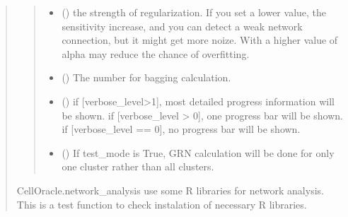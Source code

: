 \documentclass[letterpaper,10pt,english]{sphinxmanual}
\begin{document}
\begin{quote}
\begin{fulllineitems}
\begin{quote}
\begin{description}
\begin{itemize}
\item {} 
 () \textendash{} the strength of regularization.
If you set a lower value, the sensitivity increase, and you can detect a weak network connection, but it might get more noize.
With a higher value of alpha may reduce the chance of overfitting.

\item {} 
 () \textendash{} The number for bagging calculation.

\item {} 
 () \textendash{} if {[}verbose\_level\textgreater{}1{]}, most detailed progress information will be shown.
if {[}verbose\_level \textgreater{} 0{]}, one progress bar will be shown.
if {[}verbose\_level == 0{]}, no progress bar will be shown.

\item {} 
 () \textendash{} If test\_mode is True, GRN calculation will be done for only one cluster rather than all clusters.

\end{itemize}

\end{description}\end{quote}

\end{fulllineitems}


\begin{fulllineitems}
\label{\detokenize{modules/celloracle.network_analysis:celloracle.network_analysis.test_R_libraries_installation}}
CellOracle.network\_analysis use some R libraries for network analysis.
This is a test function to check instalation of necessary R libraries.

\end{fulllineitems}


\end{quote}
\end{document}
